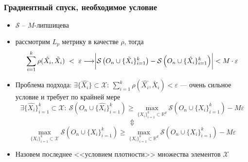 \documentclass[10pt]{beamer}
\begin{document}
\begin{frame}
	\frametitle{Градиентный спуск, необходимое условие}
		\begin{itemize}
			\item $\mathcal{S}$ -- $M$-липшицева
			\item рассмотрим $L_p$ метрику в качестве $\rho$, тогда
			$$\sum_{i=1}^k\rho(\hat{X_i}, \tilde{X_i})~<~\varepsilon\longrightarrow \biggr{|}\mathcal{S}\left(O_n\cup\{\tilde{X_i}\}_{i=1}^k\right) - \mathcal{S}\left(O_n\cup\{\hat{X_i}\}_{i=1}^k\right)\biggr{|} < M\cdot\varepsilon$$
			
			\item Проблема подхода: $\exists\{\hat{X_i}\}\subset \mathcal{X}:~ \sum\limits_{i=1}^k\rho(\hat{X_i}, \tilde{X_i}) < \varepsilon$ --- очень сильное условие и требует по крайней мере
			$$\exists \{\hat{X_i}\}_{i=1}^k\subset\mathcal{X}:~ \mathcal{S}\left(O_n\cup\{\hat{X_i}\}_{i=1}^k\right) \geqslant \max_{\{X_i\}_{i=1}^k\subset\mathbb{R}^d} \mathcal{S}\left(O_n\cup\{X_i\}_{i=1}^k\right) - M\varepsilon$$
			$$\Updownarrow$$
			$$\max_{\{X_i\}_{i=1}^k\subset\mathcal{X}} \mathcal{S}\left(O_n\cup\{X_i\}_{i=1}^k\right) \geqslant \max_{\{X_i\}_{i=1}^k\subset\mathbb{R}^d} \mathcal{S}\left(O_n\cup\{X_i\}_{i=1}^k\right) - M\varepsilon$$
			\item Назовем последнее <<условием плотности>> множества элементов $\mathcal{X}$
		\end{itemize}
\end{frame}
\end{document}
